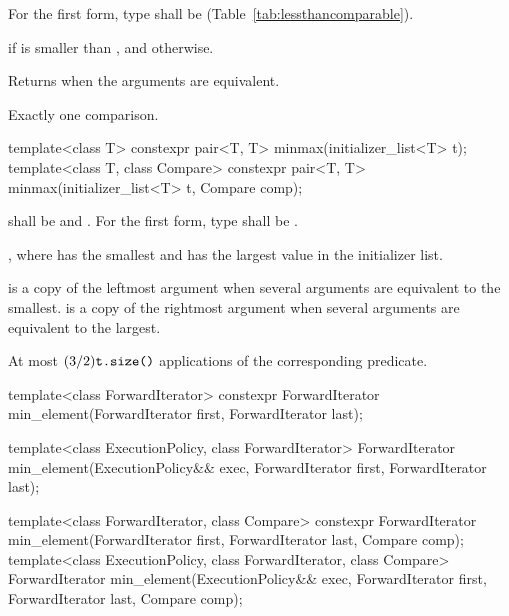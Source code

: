 \begin{itemdescr}
\pnum
\requires
For the first form, type  shall be
 (Table~\ref{tab:lessthancomparable}).

\pnum
\returns
{} if  is smaller
than , and
 otherwise.

\pnum
\remarks
Returns  when the arguments are equivalent.

\pnum
\complexity
Exactly one comparison.
\end{itemdescr}

%
\begin{itemdecl}
template<class T>
  constexpr pair<T, T> minmax(initializer_list<T> t);
template<class T, class Compare>
  constexpr pair<T, T> minmax(initializer_list<T> t, Compare comp);
\end{itemdecl}

\begin{itemdescr}
\pnum
\requires {} shall be  and .
For the first form, type  shall be .

\pnum
\returns {}, where  has the smallest and  has the
largest value in the initializer list.

\pnum
\remarks {} is a copy of the leftmost argument when several arguments are equivalent to
the smallest.  is a copy of the rightmost argument when several arguments are
equivalent to the largest.

\pnum
\complexity At most $(3/2)\texttt{t.size()}$ applications of the corresponding predicate.
\end{itemdescr}

%
\begin{itemdecl}
template<class ForwardIterator>
  constexpr ForwardIterator min_element(ForwardIterator first, ForwardIterator last);

template<class ExecutionPolicy, class ForwardIterator>
  ForwardIterator min_element(ExecutionPolicy&& exec,
                              ForwardIterator first, ForwardIterator last);

template<class ForwardIterator, class Compare>
  constexpr ForwardIterator min_element(ForwardIterator first, ForwardIterator last,
                                        Compare comp);
template<class ExecutionPolicy, class ForwardIterator, class Compare>
  ForwardIterator min_element(ExecutionPolicy&& exec,
                              ForwardIterator first, ForwardIterator last,
                              Compare comp);
\end{itemdecl}

